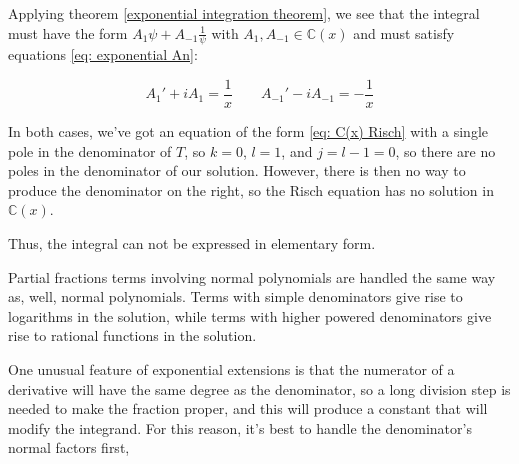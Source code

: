 Applying theorem \ref{exponential integration theorem}, we see that
the integral must have the form $A_1 \psi + A_{-1} \frac{1}{\psi}$
with $A_1, A_{-1} \in {\mathbb C}(x)$ and must satisfy
equations \eqref{eq: exponential An}:

$$A_1' + i A_1 = \frac{1}{x} \qquad A_{-1}' - i A_{-1} = - \frac{1}{x}$$

In both cases, we've got an equation of the form \eqref{eq: C(x) Risch}
with a single pole in the denominator of $T$, so $k=0$, $l=1$,
and $j=l-1=0$, so there are no poles in the denominator of our solution.
However, there is then no way to produce the denominator on the
right, so the Risch equation has no solution in ${\mathbb C}(x)$.


Thus, the integral can not be expressed in elementary form.

\endexample

\vfil\eject

Partial fractions terms involving normal polynomials are handled the
same way as, well, normal polynomials.  Terms with simple denominators
give rise to logarithms in the solution, while terms with higher
powered denominators give rise to rational functions in the solution.

One unusual feature of exponential extensions is that the numerator of
a derivative will have the same degree as the denominator, so a long
division step is needed to make the fraction proper, and this will
produce a constant that will modify the integrand.  For this reason,
it's best to handle the denominator's normal factors first,



\begin{comment}

\vfil\eject

\example Compute $\int {{4^x-1}\over{2^x+1}} {\rm d}x$
\label{integrate 4^x-1/2^x+1}

We'll use the field ${\mathbb C}(x,\Psi = \exp(x \ln 2))$; $\Psi' =
(\ln 2)\Psi$ and the representation (see Example
\ref{represent 4^x+1/2^x+1}):

$$ \frac{\Psi^2-1}{\Psi+1} = \Psi-1$$

So we need to find a solution of the form $a\Psi + \bar{b}$ ($\bar{b}$
can include additional logarithmic elements) that satisfy the Risch
equations:

$$a'\Psi + a\Psi' = a'\Psi + a(\ln 2)\Psi = \Psi \qquad a' + a(\ln 2) = 1$$
$$\bar{b}' = -1$$

Both equations have fairly obvious solutions:

$$a = \frac{1}{\ln 2} \qquad \bar{b}=-x$$

So our solution is

$$\int {{4^x+1}\over{2^x+1}} {\rm d}x = \frac{1}{\ln 2}\Psi - x =
\frac{1}{\ln 2}2^x - x$$

\endexample

\end{comment}

